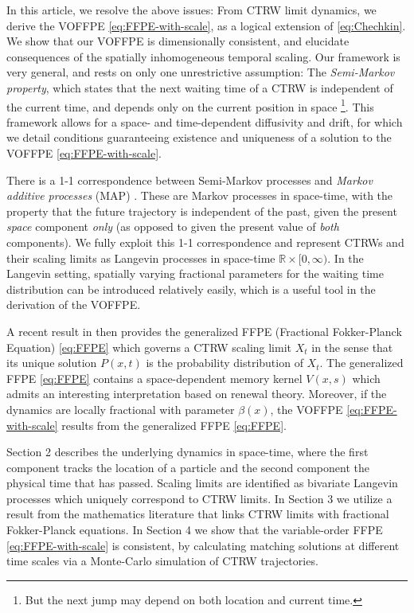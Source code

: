 \documentclass[a4paper,12pt]{elsarticle}
\numberwithin{equation}{section}
\theoremstyle{plain}
\theoremstyle{definition}
\theoremstyle{remark}
\numberwithin{equation}{section}
\newcommand{\spc}{\mathbb R}
\newcommand{\spctim}{\spc \times [0,\infty)}
\newcommand{\1}{\mathbf 1}
\begin{document}
In this article, we resolve the above issues: 
From CTRW limit dynamics, we derive the VOFFPE \eqref{eq:FFPE-with-scale}, 
as a logical extension of \eqref{eq:Chechkin}. 
We show that our VOFFPE is dimensionally consistent, and elucidate consequences 
of the spatially inhomogeneous temporal scaling. 
Our framework is very general, and rests on only one unrestrictive assumption: 
The \emph{Semi-Markov property}, which states that the next waiting time of a 
CTRW is independent of the current time, and depends only on the current 
position in space \cite{Germano2009,Meerschaert2014}\footnote{But the next jump 
may depend on both location and current time.}.
This framework allows for a space- and time-dependent diffusivity and drift,
for which we detail conditions guaranteeing existence and uniqueness of a 
solution to the VOFFPE \eqref{eq:FFPE-with-scale}.

There is a 1-1 correspondence between Semi-Markov processes and 
\emph{Markov additive processes} (MAP) \cite{cinlar1974markov}.
These are Markov processes in space-time, with the property that
the future trajectory is independent of the past, given the present 
\emph{space} component \emph{only} (as opposed to given the present value 
of \emph{both} components). 
We fully exploit this 1-1 correspondence and 
represent CTRWs and their scaling limits as Langevin processes in 
space-time $\spctim$.
In the Langevin setting, spatially varying fractional parameters 
for the waiting time distribution can be introduced relatively easily, 
which is a useful tool in the derivation of the VOFFPE.

A recent result in \cite{BaeumerStraka16} then provides the
generalized FFPE (Fractional Fokker-Planck Equation) \eqref{eq:FFPE}
which governs a CTRW scaling limit $X_t$ in the sense that its unique 
solution $P(x,t)$ is the probability distribution of $X_t$. 
The generalized FFPE \eqref{eq:FFPE} contains a 
space-dependent memory kernel $V(x,s)$ which admits an interesting 
interpretation
based on renewal theory.  Moreover, if the dynamics are locally fractional
with parameter $\beta(x)$, the VOFFPE
\eqref{eq:FFPE-with-scale} results from the generalized FFPE
\eqref{eq:FFPE}.

Section 2 describes the underlying dynamics in space-time, where the first
component tracks the location of a particle and the second component the
physical time that has passed.  Scaling limits are identified as bivariate
Langevin processes which uniquely correspond to CTRW limits.
In Section 3 we utilize a result from the mathematics literature that links CTRW 
limits with fractional Fokker-Planck equations.
In Section 4 we show that the variable-order FFPE \eqref{eq:FFPE-with-scale} is consistent, by  calculating matching solutions at different time scales via a Monte-Carlo simulation of CTRW trajectories.
\end{document}
